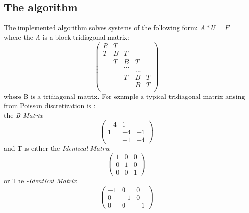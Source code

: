 \subsection{The algorithm}

The implemented algorithm solves systems of the following form:
 $A*U = F$\\  
where the \emph{A} is a block tridiagonal matrix: 
\[ \left( \begin{array}{ccccc}
B  & T &     &   &\\
T  & B &  T  &    &\\
   & T &  B  & T  &\\
   &   & ...    &    &  \\     
   &   &     & ...  &  \\
   &   &  T  & B & T \\    
   &   &     & B & T\\	
    \end{array} \right)\] 
where B is a tridiagonal matrix. For example a typical tridiagonal matrix arising from 
Poisson discretization is : \\
the \emph{B Matrix}
\[ \left( \begin{array}{ccc}
-4 & 1 &  \\
1  & -4 & -1 \\
   & -1 & -4 \end{array} \right)\] 
and T is either the \emph{Identical Matrix}
\[ \left( \begin{array}{ccc}
1 & 0 & 0 \\
0 & 1 & 0 \\
0 & 0 & 1 \end{array} \right)\] or The \emph{-Identical Matrix}
\[ \left( \begin{array}{ccc}
-1 & 0 & 0 \\
0 & -1 & 0 \\
0 & 0 & -1 \end{array} \right)\] 
\\

